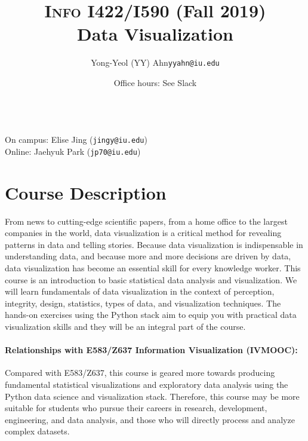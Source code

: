 \documentclass[11pt,article,oneside]{memoir} %
\makeatletter
\def\myauthor{Author}
\def\mytitle{Title}
\def\myemail{yyahn@iu.edu}
\def\myauthor{Yong-Yeol (YY) Ahn}
\def\mytitle{{\normalsize \textsc{Info} I422/I590 (Fall 2019)} \\ \HUGE{} Data Visualization}
\makeatother
\begin{document}

\title{\LARGE \mytitle} %
\author{\Large\myauthor\newline \footnotesize\texttt{\noindent\myemail}}

\maketitle 

\vspace{-20pt}{\bfseries Assistant Instructors} \\ %
On campus: Elise Jing (\texttt{jingy@iu.edu}) \\
Online: Jaehyuk Park (\texttt{jp70@iu.edu}) \\

\date{Office hours: See Slack}
\section{Course Description}%

From news to cutting-edge scientific papers, from a home office to the largest companies in the world, data visualization is a critical method for revealing patterns in data and telling stories. 
Because data visualization is indispensable in understanding data, and because more and more decisions are driven by data, data visualization has become an essential skill for every knowledge worker.  
This course is an introduction to basic statistical data analysis and visualization.  
We will learn fundamentals of data visualization in the context of perception, integrity, design, statistics, types of data, and visualization techniques.  
The hands-on exercises using the Python stack aim to equip you with practical data visualization skills and they will be an integral part of the course. 

\paragraph{Relationships with E583/Z637 Information Visualization (IVMOOC):}
Compared with E583/Z637, this course is geared more towards producing fundamental statistical visualizations and exploratory data analysis using the Python data science and visualization stack.  
Therefore, this course may be more suitable for students who pursue their careers in research, development, engineering, and data analysis, and those who will directly process and analyze complex datasets. 
\end{document}
